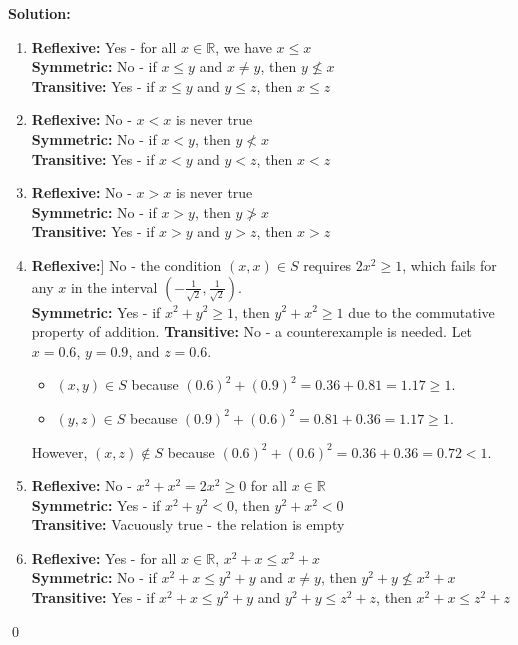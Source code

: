 \bigskip\noindent\textbf{Solution:}  
\begin{enumerate}[label=(\alph*)]
\item \textbf{Reflexive:} Yes - for all $x \in \mathbb{R}$, we have $x \leq x$ \\
\textbf{Symmetric:} No - if $x \leq y$ and $x \neq y$, then $y \not\leq x$ \\
\textbf{Transitive:} Yes - if $x \leq y$ and $y \leq z$, then $x \leq z$

\item \textbf{Reflexive:} No - $x < x$ is never true \\
\textbf{Symmetric:} No - if $x < y$, then $y \not< x$ \\
\textbf{Transitive:} Yes - if $x < y$ and $y < z$, then $x < z$

\item \textbf{Reflexive:} No - $x > x$ is never true \\
\textbf{Symmetric:} No - if $x > y$, then $y \not> x$ \\
\textbf{Transitive:} Yes - if $x > y$ and $y > z$, then $x > z$

\item  \textbf{Reflexive:}] No - the condition $(x,x) \in S$ requires $2x^2 \geq 1$, which fails for any $x$ in the interval $(-\frac{1}{\sqrt{2}}, \frac{1}{\sqrt{2}})$. \\
\textbf{Symmetric:} Yes - if $x^2 + y^2 \geq 1$, then $y^2 + x^2 \geq 1$ due to the commutative property of addition. 
\textbf{Transitive:} No - a counterexample is needed. Let $x = 0.6$, $y = 0.9$, and $z = 0.6$.
\begin{itemize}
\item $(x,y) \in S$ because $(0.6)^2 + (0.9)^2 = 0.36 + 0.81 = 1.17 \geq 1$.
\item $(y,z) \in S$ because $(0.9)^2 + (0.6)^2 = 0.81 + 0.36 = 1.17 \geq 1$.
\end{itemize}
However, $(x,z) \notin S$ because $(0.6)^2 + (0.6)^2 = 0.36 + 0.36 = 0.72 < 1$.

\item \textbf{Reflexive:} No - $x^2 + x^2 = 2x^2 \geq 0$ for all $x \in \mathbb{R}$ \\
\textbf{Symmetric:} Yes - if $x^2 + y^2 < 0$, then $y^2 + x^2 < 0$ \\
\textbf{Transitive:} Vacuously true - the relation is empty

\item \textbf{Reflexive:} Yes - for all $x \in \mathbb{R}$, $x^2 + x \leq x^2 + x$ \\
\textbf{Symmetric:} No - if $x^2 + x \leq y^2 + y$ and $x \neq y$, then $y^2 + y \not\leq x^2 + x$ \\
\textbf{Transitive:} Yes - if $x^2 + x \leq y^2 + y$ and $y^2 + y \leq z^2 + z$, then $x^2 + x \leq z^2 + z$
\end{enumerate}\qed




